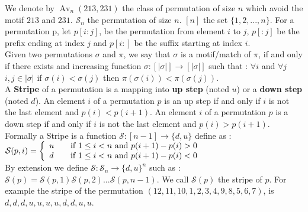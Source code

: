 \documentclass[a4paper]{llncs}
\DeclareMathOperator{\Avd}{Av}
\newcommand\Av[2]{\Avd_{{#1}}({#2})}
\newcommand{\Perm}[1]{\mathcal{S}_{#1}}
\newcommand{\ptext}{\pi}
\newcommand{\pmotif}{\sigma}
\newcounter{num}
\newcommand{\num}{\stepcounter{num} }
\newcommand{\dstep}{d}
\newcommand{\ustep}{u}
\begin{document}
		We denote by $\Av{n}{213,231}$ the class
		of permutation of size $n$ which avoid 
		the motif $213$ and $231$. 
		$\Perm{n}$ the permutation of size $n$.
		$[n]$ the set $\{1,2,...,n\}.$
		For a permutation p, let $p[i:j]$, 
		be the permutation from element $i$ to $j$,
		$p[:j]$ be the prefix ending at index $j$
		and $p[i:]$ be the suffix starting at index $i$.\\
		
		Given two permutations
		$\pmotif$ and $\ptext$,
		we say that $\pmotif$
		is a motif/match of
		$\ptext$,
		if and only if
		there exists 
		and increasing function 
		$\sigma:[|\pmotif|] \rightarrow [|\pmotif|]$
		such that : $\forall i$ and 
		$\forall j$ $i,j \in |\pmotif| $
		if $\pmotif(i)<\pmotif(j)$
		then $\ptext(\sigma(i))<\ptext(\sigma(j))$.\\
		
		
		A \textbf{Stripe} of a permutation
		is a mapping into \textbf{up step} (noted $\ustep$) 
		or a \textbf{down step} (noted $\dstep$).
		An element $i$ of a permutation $p$ is an up step if and only if $i$ is not the last element and $p(i)<p(i+1)$.
		An element $i$ of a permutation $p$ is a down step if and only if $i$ is not the last element and $p(i)>p(i+1)$.\\	
		Formally a Stripe is a function $\mathcal{S} : [n-1] \to \{\dstep,\ustep\}$ define as :\\
		$ \mathcal{S}(p,i) = \left\{ 
		  \begin{array}{l l}
		    \ustep & \quad \text{if $1 \leq i<n$ and $p(i+1)-p(i)>0$ }\\
		    \dstep & \quad \text{if $1 \leq i<n$ and $p(i+1)-p(i)<0$ }\\
		  \end{array} \right. $\\
		  
		By extension we define  $\mathcal{S} : \Perm{n} \to \{\dstep,\ustep\}^{n}$ such as :
		$\mathcal{S}(p)=\mathcal{S}(p,1)\mathcal{S}(p,2)...\mathcal{S}(p,n-1)$.
		We call $\mathcal{S}(p)$ the stripe of $p$.
		For example the stripe of the permutation $(12,11,10,1,2,3,4,9,8,5,6,7)$, 
		is $\dstep,\dstep,\dstep,\ustep,\ustep,\ustep,\ustep,\dstep,\dstep,\ustep,\ustep$.\\
		  
	  			 		  	
\end{document}
